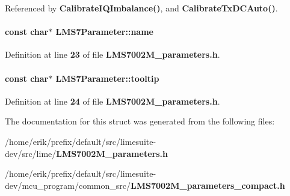 Referenced by {\bf Calibrate\+I\+Q\+Imbalance()}, and {\bf Calibrate\+Tx\+D\+C\+Auto()}.

\paragraph[{name}]{\setlength{\rightskip}{0pt plus 5cm}const char$\ast$ L\+M\+S7\+Parameter\+::name}\label{structLMS7Parameter_a3364b5a52f864678818d2b38f2f93214}


Definition at line {\bf 23} of file {\bf L\+M\+S7002\+M\+\_\+parameters.\+h}.

\paragraph[{tooltip}]{\setlength{\rightskip}{0pt plus 5cm}const char$\ast$ L\+M\+S7\+Parameter\+::tooltip}\label{structLMS7Parameter_a91d58ac69443282e848e7d76748627c6}


Definition at line {\bf 24} of file {\bf L\+M\+S7002\+M\+\_\+parameters.\+h}.



The documentation for this struct was generated from the following files\+:\begin{DoxyCompactItemize}
\item 
/home/erik/prefix/default/src/limesuite-\/dev/src/lime/{\bf L\+M\+S7002\+M\+\_\+parameters.\+h}\item 
/home/erik/prefix/default/src/limesuite-\/dev/mcu\+\_\+program/common\+\_\+src/{\bf L\+M\+S7002\+M\+\_\+parameters\+\_\+compact.\+h}\end{DoxyCompactItemize}
